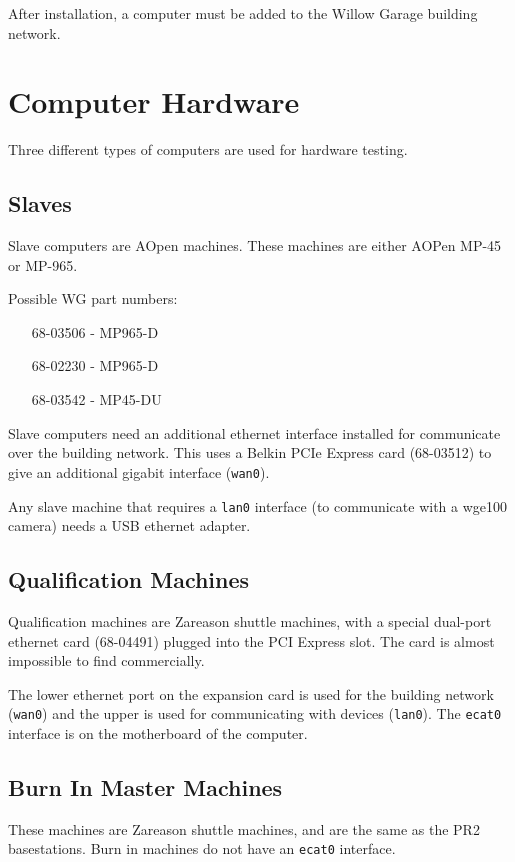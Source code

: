 \documentclass[11pt]{report}
\begin{document}
After installation, a computer must be added to the Willow Garage building network.


\section{Computer Hardware}

Three different types of computers are used for hardware testing.

\subsection{Slaves}

Slave computers are AOpen machines. These machines are either AOPen MP-45 or MP-965. 

Possible WG part numbers:
\begin{itemize}
\item [68-03506] - MP965-D
\item [68-02230] - MP965-D
\item [68-03542] - MP45-DU
\end{itemize}

Slave computers need an additional ethernet interface installed for communicate over the building network. This uses a Belkin PCIe Express card (68-03512) to give an additional gigabit interface (\texttt{wan0}).

Any slave machine that requires a \texttt{lan0} interface (to communicate with a wge100 camera) needs a USB ethernet adapter. 

\subsection{Qualification Machines}

Qualification machines are Zareason shuttle machines, with a special dual-port ethernet card (68-04491) plugged into the PCI Express slot. The card is almost impossible to find commercially.

The lower ethernet port on the expansion card is used for the building network (\texttt{wan0}) and the upper is used for communicating with devices (\texttt{lan0}). The \texttt{ecat0} interface is on the motherboard of the computer.

\subsection{Burn In Master Machines}

These machines are Zareason shuttle machines, and are the same as the PR2 basestations. Burn in machines do not have an \texttt{ecat0} interface.
\end{document}
